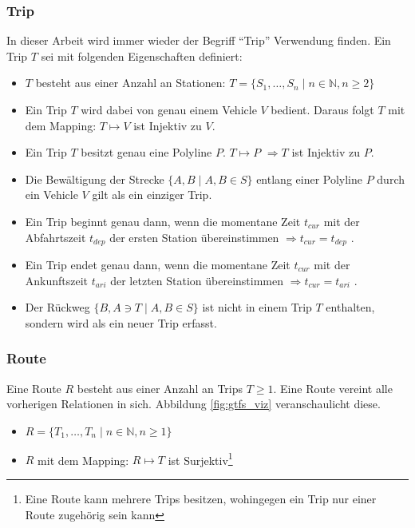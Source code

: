   \subsubsection{Trip}
  \label{ssub:trip}
    In dieser Arbeit wird immer wieder der Begriff "`Trip"' Verwendung finden. Ein Trip $T$ sei mit folgenden Eigenschaften definiert:
    \begin{itemize}
      \item $T$ besteht aus einer Anzahl an Stationen: $T = \{S_1, \dotsc, S_n \;|\; n \in \mathbb{N}, n \geq 2 \}$

      \item Ein Trip $T$ wird dabei von genau einem Vehicle $V$ bedient. Daraus folgt $T$ mit dem Mapping: $T \mapsto V$ ist Injektiv zu $V$. 

      \item Ein Trip $T$ besitzt genau eine Polyline $P$. $T \mapsto P$ $ \Rightarrow T$ ist Injektiv zu $P$. 

      \item Die Bewältigung der Strecke $\{A,B \;|\; A, B \in S\}$ entlang einer Polyline $P$ durch ein Vehicle $V$ gilt als ein einziger Trip.

      \item Ein Trip beginnt genau dann, wenn die momentane Zeit $t_{cur}$ mit der Abfahrtszeit $t_{dep}$ der ersten Station übereinstimmen $\Rightarrow t_{cur} = t_{dep} $ .

      \item Ein Trip endet genau dann, wenn die momentane Zeit $t_{cur}$ mit der Ankunftszeit $t_{ari}$ der letzten Station übereinstimmen $\Rightarrow t_{cur} = t_{ari} $ .

      \item Der Rückweg $\{B, A \ni T \;|\; A, B \in S\}$ ist nicht in einem Trip $T$ enthalten, sondern wird als ein neuer Trip erfasst.
    \end{itemize}
    

    \subsubsection{Route}
    \label{ssub:route}
      Eine Route $R$ besteht aus einer Anzahl an Trips $T \geq 1$. Eine Route vereint alle vorherigen Relationen in sich. Abbildung \ref{fig:gtfs_viz} veranschaulicht diese. 

      \begin{itemize}
        \item $R = \{ T_1, \dotsc, T_n \;|\; n \in \mathbb{N}, n \geq 1 \}$

        \item $R$ mit dem Mapping: $R \mapsto T$ ist Surjektiv\footnote{Eine Route kann mehrere Trips besitzen, wohingegen ein Trip nur einer Route zugehörig sein kann} 
      \end{itemize}     

